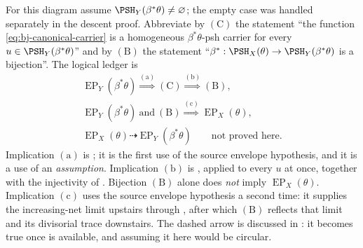 For this diagram assume $\PSH_Y(\beta^*\theta)\ne\varnothing$;
the empty case was handled separately in the descent proof.
Abbreviate by $(\mathrm C)$ the statement ``the function
\eqref{eq:bj-canonical-carrier} is a homogeneous $\beta^*\theta$-psh
carrier for every $u\in\PSH_Y(\beta^*\theta)$'' and by $(\mathrm B)$ the
statement ``$\beta^*:\PSH_X(\theta)\to\PSH_Y(\beta^*\theta)$ is
a bijection''.  The logical ledger is
\[
\begin{gathered}
 \operatorname{EP}_Y(\beta^*\theta)
 \overset{\mathrm{(a)}}{\Longrightarrow}(\mathrm C)
 \overset{\mathrm{(b)}}{\Longrightarrow}(\mathrm B),\\
 \operatorname{EP}_Y(\beta^*\theta)\ \text{and}\ (\mathrm B)
 \overset{\mathrm{(c)}}{\Longrightarrow}
 \operatorname{EP}_X(\theta),\\
 \operatorname{EP}_X(\theta)
 \dashrightarrow \operatorname{EP}_Y(\beta^*\theta)
 \qquad\text{not proved here}.
\end{gathered}
\tag{39.55}\label{eq:bj-ep-reflection-diagram}
\]
Implication $\mathrm{(a)}$ is ; it is the
first use of the source envelope hypothesis, and it is a use of an
\emph{assumption}.  Implication $\mathrm{(b)}$ is
, applied to every $u$ at once, together
with the injectivity of .  Bijection $(\mathrm B)$
alone does \emph{not} imply $\operatorname{EP}_X(\theta)$.  Implication
$\mathrm{(c)}$ uses the source envelope hypothesis a second time: it
supplies the increasing-net limit upstairs through
, after which $(\mathrm B)$ reflects
that limit and its divisorial trace downstairs.  The dashed arrow is
discussed in : it becomes true once
 is available, and assuming it here would be
circular.

